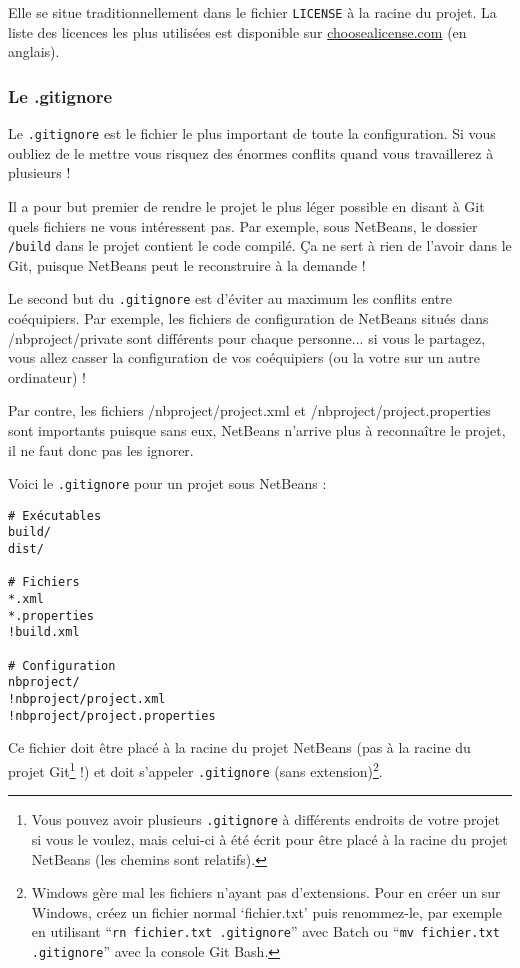 \documentclass[10pt,a4paper]{article}
\begin{document}
Elle se situe traditionnellement dans le fichier {\tt LICENSE} à la racine du projet. La liste des licences les plus utilisées est disponible sur \href{https://choosealicense.com/}{choosealicense.com} (en anglais).

\subsubsection{Le .gitignore\label{gitignore}}

Le {\tt .gitignore} est le fichier le plus important de toute la configuration. Si vous oubliez de le mettre vous risquez des énormes conflits quand vous travaillerez à plusieurs !

Il a pour but premier de rendre le projet le plus léger possible en disant à Git quels fichiers ne vous intéressent pas. Par exemple, sous NetBeans, le dossier {\tt /build} dans le projet contient le code compilé. Ça ne sert à rien de l'avoir dans le Git, puisque NetBeans peut le reconstruire à la demande !

Le second but du {\tt .gitignore} est d'éviter au maximum les conflits entre coéquipiers. Par exemple, les fichiers de configuration de NetBeans situés dans /nbproject/private sont différents pour chaque personne... si vous le partagez, vous allez casser la configuration de vos coéquipiers (ou la votre sur un autre ordinateur) !

Par contre, les fichiers /nbproject/project.xml et /nbproject/project.properties sont importants puisque sans eux, NetBeans n'arrive plus à reconnaître le projet, il ne faut donc pas les ignorer.

Voici le {\tt .gitignore} pour un projet sous NetBeans :

\begin{verbatim}
# Exécutables
build/
dist/

# Fichiers
*.xml
*.properties
!build.xml

# Configuration
nbproject/
!nbproject/project.xml
!nbproject/project.properties
\end{verbatim}

Ce fichier doit être placé à la racine du projet NetBeans (pas à la racine du projet Git\footnote{Vous pouvez avoir plusieurs {\tt .gitignore} à différents endroits de votre projet si vous le voulez, mais celui-ci à été écrit pour être placé à la racine du projet NetBeans (les chemins sont relatifs).} !) et doit s'appeler {\tt .gitignore} (sans extension)\footnote{Windows gère mal les fichiers n'ayant pas d'extensions. Pour en créer un sur Windows, créez un fichier normal `fichier.txt' puis renommez-le, par exemple en utilisant ``{\tt rn fichier.txt .gitignore}'' avec Batch ou ``{\tt mv fichier.txt .gitignore}'' avec la console Git Bash.}.
\end{document}
